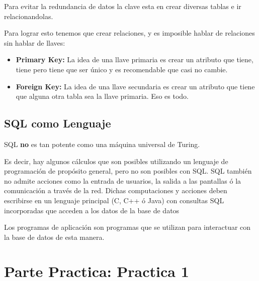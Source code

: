 \documentclass[12pt, fleqn]{article}                             %
\begin{document}
            Para evitar la redundancia de datos la clave esta en crear diversas tablas
            e ir relacionandolas.

            Para lograr esto tenemos que crear relaciones, y es imposible hablar de relaciones
            sin hablar de llaves:


            \begin{itemize}
                \item
                    \textbf{Primary Key:}
                    La idea de una llave primaria es crear un atributo que tiene, tiene pero
                    tiene que ser único y es recomendable que casi no cambie.


                \item
                    \textbf{Foreign Key:}
                    La idea de una llave secundaria es crear un atributo que tiene que alguna otra
                    tabla sea la llave primaria. Eso es todo.

            \end{itemize}


    \subsection{SQL como Lenguaje}
        
        SQL \textbf{no} es tan potente como una máquina universal de Turing.

        Es decir, hay algunos cálculos que son posibles utilizando un lenguaje de programación
        de propósito general, pero no son posibles con SQL.
        SQL también no admite acciones como la entrada de usuarios, la salida a las pantallas 
        ó la comunicación a través de la red.
        Dichas computaciones y acciones deben escribirse en un lenguaje principal (C, C++ ó Java)
        con consultas SQL incorporadas que acceden a los datos de la base de datos

        Los programas de aplicación son programas que se utilizan para interactuar con la base de
        datos de esta manera.



\clearpage
\section{Parte Practica: Practica 1}
\end{document}

